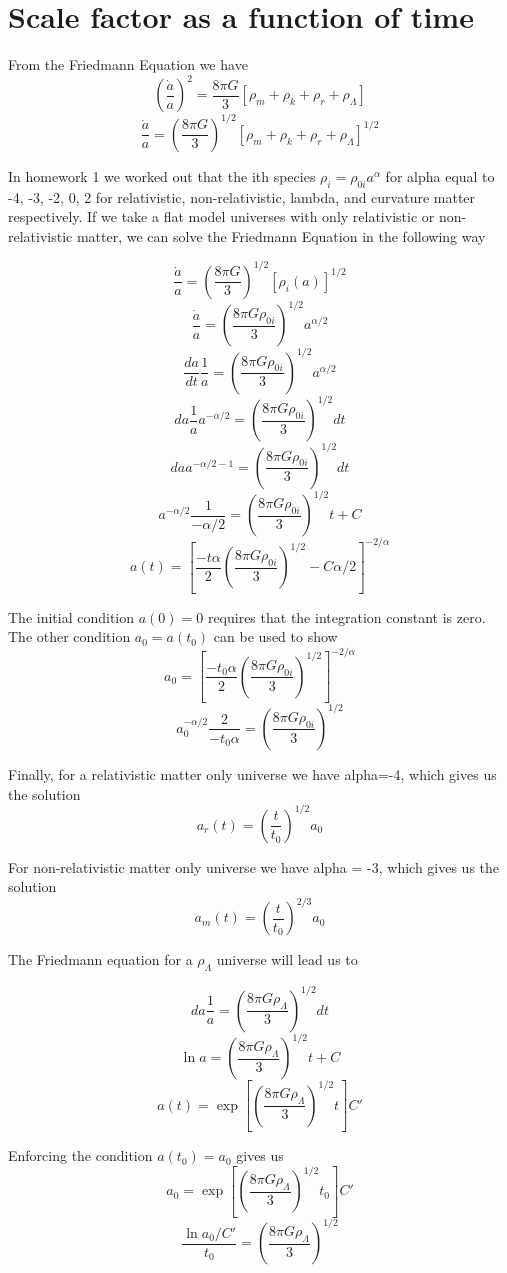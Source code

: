 \documentclass[12pt]{article}
\begin{document}
\section{Scale factor as a function of time}
From the Friedmann Equation we have
$$ (\frac{\dot{a}}{a})^{2} = \frac{8\pi G}{3}[\rho_{m} + \rho_k + \rho_r + \rho_{\Lambda}] $$
$$ \frac{\dot{a}}{a} = (\frac{8\pi G}{3})^{1/2}[\rho_{m} + \rho_k + \rho_r + \rho_{\Lambda}]^{1/2}$$

In homework 1 we worked out that the ith species $\rho_i = \rho_{0 i}a^{\alpha}$ for alpha equal to -4, -3, -2, 0, 2 for relativistic, non-relativistic, lambda, and curvature matter respectively. If we take a flat model universes with only relativistic or non-relativistic matter, we can solve the Friedmann Equation in the following way

$$ \frac{\dot{a}}{a} = (\frac{8\pi G}{3})^{1/2}[\rho_{i}(a)]^{1/2} $$
$$ \frac{\dot{a}}{a} = (\frac{8\pi G \rho_{0 i}}{3})^{1/2}a^{\alpha/2} $$
$$ \frac{da}{dt} \frac{1}{a} = (\frac{8\pi G \rho_{0 i}}{3})^{1/2}a^{\alpha/2} $$
$$ da \frac{1}{a} a^{-\alpha/2}= (\frac{8\pi G \rho_{0 i}}{3})^{1/2} dt $$
$$ da  a^{-\alpha/2 -1}= (\frac{8\pi G \rho_{0 i}}{3})^{1/2} dt $$
$$ a^{-\alpha/2} \frac{1}{-\alpha/2} = (\frac{8\pi G \rho_{0 i}}{3})^{1/2} t + C$$
$$ a(t)  = [\frac{-t\alpha}{2} (\frac{8\pi G \rho_{0 i}}{3})^{1/2}  -C \alpha/2]^{-2/\alpha} $$

The initial condition $a(0) = 0$ requires that the integration constant is zero. The other condition $a_0 = a(t_0)$ can be used to show
$$a_0  = [\frac{-t_0 \alpha}{2} (\frac{8\pi G \rho_{0 i}}{3})^{1/2}]^{-2/\alpha}$$
$$a_{0}^{-\alpha/2} \frac{2}{-t_0 \alpha} = (\frac{8\pi G \rho_{0 i}}{3})^{1/2}$$

Finally, for a relativistic matter only universe we have alpha=-4, which gives us the solution
$$a_{r}(t)  = (\frac{t}{t_0 })^{1/2} a_{0}$$

For non-relativistic matter only universe we have alpha = -3, which gives us the solution
$$ a_{m}(t)  = (\frac{t}{t_0})^{2/3} a_0$$

The Friedmann equation for a $\rho_{\Lambda}$ universe will lead us to

$$ da \frac{1}{a} = (\frac{8\pi G \rho_{\Lambda}}{3})^{1/2} dt $$
$$ \ln a =  (\frac{8\pi G \rho_{\Lambda}}{3})^{1/2} t + C$$
$$a(t) = \exp[(\frac{8\pi G \rho_{\Lambda}}{3})^{1/2} t]  C'$$

Enforcing the condition $a(t_0) = a_0$ gives us 
$$a_0 = \exp[(\frac{8\pi G \rho_{\Lambda}}{3})^{1/2} t_0]  C'$$
$$\frac{\ln a_0/C'}{t_0} = (\frac{8\pi G \rho_{\Lambda}}{3})^{1/2} $$
\end{document}
